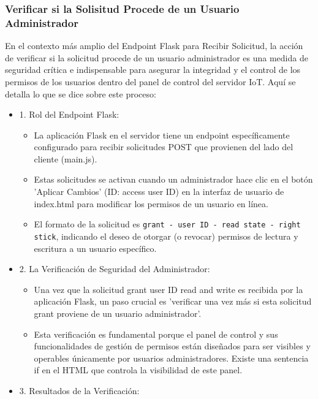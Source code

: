 \documentclass{report}
\begin{document}
\subsubsection{Verificar si la Solisitud Procede de un Usuario Administrador}
En el contexto más amplio del Endpoint Flask para Recibir Solicitud, la acción de verificar si la solicitud procede de un usuario 
administrador es una medida de seguridad crítica e indispensable para asegurar la integridad y el control de los permisos de los usuarios 
dentro del panel de control del servidor IoT.
Aquí se detalla lo que se dice sobre este proceso:
\begin{itemize}
    \item 1. Rol del Endpoint Flask:
        \begin{itemize}
            \item La aplicación Flask en el servidor tiene un endpoint específicamente configurado para recibir solicitudes POST que 
            provienen del lado del cliente (main.js).
            \item Estas solicitudes se activan cuando un administrador hace clic en el botón 'Aplicar Cambios' (ID: access user ID) en la 
            interfaz de usuario de index.html para modificar los permisos de un usuario en línea.
            \item El formato de la solicitud es \verb|grant - user ID - read state - right stick|, indicando el deseo de otorgar (o revocar) 
            permisos de lectura y escritura a un usuario específico.
        \end{itemize}
    \item 2. La Verificación de Seguridad del Administrador:
        \begin{itemize}
            \item Una vez que la solicitud grant user ID read and write es recibida por la aplicación Flask, un paso crucial 
            es 'verificar una vez más si esta solicitud grant proviene de un usuario administrador'.
            \item Esta verificación es fundamental porque el panel de control y sus funcionalidades de gestión de permisos están diseñados 
            para ser visibles y operables únicamente por usuarios administradores. Existe una sentencia if en el HTML que controla la 
            visibilidad de este panel.
        \end{itemize}
    \item 3. Resultados de la Verificación:

\end{itemize}
\end{document}
